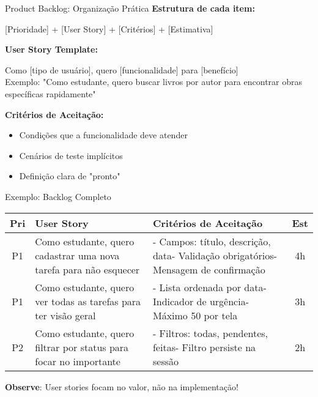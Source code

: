 \documentclass[10pt]{beamer}
\begin{document}
\begin{frame}{Product Backlog: Organização Prática}
\textbf{Estrutura de cada item:}
\begin{center}
[Prioridade] + [User Story] + [Critérios] + [Estimativa]
\end{center}

\vspace{0.3cm}
\textbf{User Story Template:}
\begin{alertblock}{}
Como [tipo de usuário], quero [funcionalidade] para [benefício]\\
Exemplo: "Como estudante, quero buscar livros por autor para encontrar obras específicas rapidamente"
\end{alertblock}

\vspace{0.3cm}
\textbf{Critérios de Aceitação:}
\begin{itemize}
    \item Condições que a funcionalidade deve atender
    \item Cenários de teste implícitos
    \item Definição clara de "pronto"
\end{itemize}
\end{frame}

\begin{frame}{Exemplo: Backlog Completo}
\scriptsize
\begin{tabular}{|c|p{5cm}|p{3cm}|c|}
\hline
\textbf{Pri} & \textbf{User Story} & \textbf{Critérios de Aceitação} & \textbf{Est} \\
\hline
P1 & Como estudante, quero cadastrar uma nova tarefa para não esquecer & - Campos: título, descrição, data\newline - Validação obrigatórios\newline - Mensagem de confirmação & 4h \\
\hline
P1 & Como estudante, quero ver todas as tarefas para ter visão geral & - Lista ordenada por data\newline - Indicador de urgência\newline - Máximo 50 por tela & 3h \\
\hline
P2 & Como estudante, quero filtrar por status para focar no importante & - Filtros: todas, pendentes, feitas\newline - Filtro persiste na sessão & 2h \\
\hline
\end{tabular}

\vspace{0.2cm}
\textbf{Observe}: User stories focam no valor, não na implementação!
\end{frame}
\end{document}
